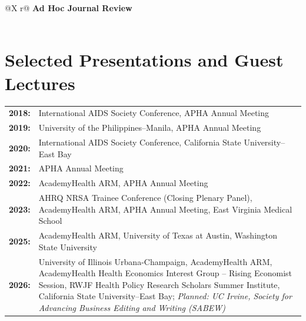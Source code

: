 \documentclass[letterpaper,11pt]{article}
\begin{document}
\begin{tabularx}{\linewidth}{@{}X r@{}}
\textbf{Ad Hoc Journal Review} \\
 \\
\end{tabularx}

\section{Selected Presentations and Guest Lectures}
\begin{tabularx}{\linewidth}{@{}l X@{}}	
  \textbf{2018:} & International AIDS Society Conference, APHA Annual Meeting \\
  \textbf{2019:} & University of the Philippines--Manila, APHA Annual Meeting \\
  \textbf{2020:} & International AIDS Society Conference, California State University--East Bay \\
  \textbf{2021:} & APHA Annual Meeting \\
  \textbf{2022:} & AcademyHealth ARM, APHA Annual Meeting \\
  \textbf{2023:} & AHRQ NRSA Trainee Conference (Closing Plenary Panel), AcademyHealth ARM, APHA Annual Meeting, East Virginia Medical School \\
  \textbf{2025:} & AcademyHealth ARM, University of Texas at Austin, Washington State University \\
  \textbf{2026:} & University of Illinois Urbana-Champaign, AcademyHealth ARM, AcademyHealth Health Economics Interest Group -- Rising Economist Session, RWJF Health Policy Research Scholars Summer Institute, California State University--East Bay; \textit{Planned: UC Irvine, Society for Advancing Business Editing and Writing (SABEW)} \\
\end{tabularx}
\end{document}
